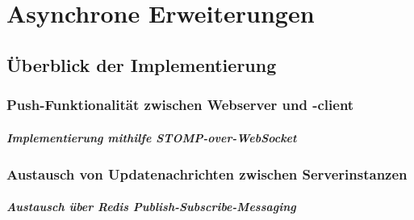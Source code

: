 \chapter{Asynchrone Erweiterungen}
\section{Überblick der Implementierung}
\subsection{Push-Funktionalität zwischen Webserver und -client}
\paragraph{Implementierung mithilfe STOMP-over-WebSocket}
\subsection{Austausch von Updatenachrichten zwischen
Serverinstanzen}
\paragraph{Austausch über Redis Publish-Subscribe-Messaging}
